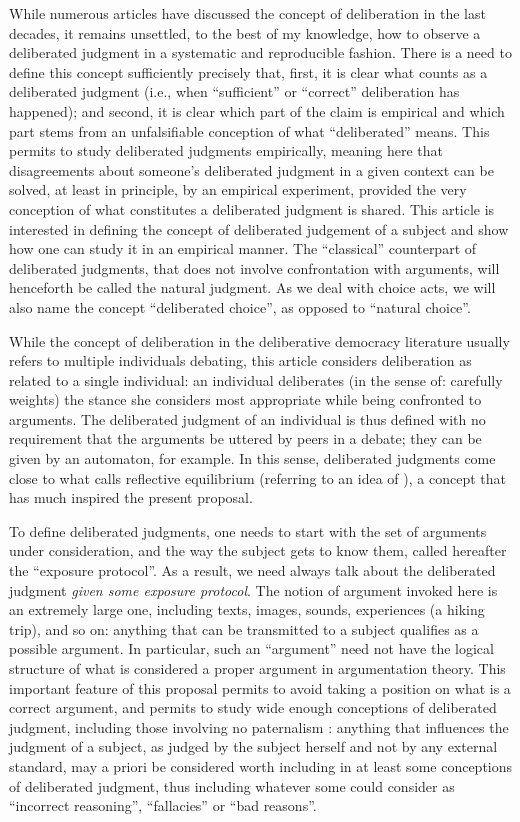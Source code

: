 \documentclass[version=last, pagesize, twoside=off, bibliography=totoc, DIV=calc, fontsize=12pt, a4paper, french, english]{scrartcl}
\begin{document}
While numerous articles have discussed the concept of deliberation in the last decades, it remains unsettled, to the best of my knowledge, how to observe a deliberated judgment in a systematic and reproducible fashion. There is a need to define this concept sufficiently precisely that, first, it is clear what counts as a deliberated judgment (i.e., when “sufficient” \citep{meinard_justification_2020} or “correct” deliberation has happened); and second, it is clear which part of the claim is empirical and which part stems from an unfalsifiable conception of what “deliberated” means. This permits to study deliberated judgments empirically, meaning here that disagreements about someone’s deliberated judgment in a given context can be solved, at least in principle, by an empirical experiment, provided the very conception of what constitutes a deliberated judgment is shared. This article is interested in defining the concept of deliberated judgement of a subject and show how one can study it in an empirical manner. The “classical” counterpart of deliberated judgments, that does not involve confrontation with arguments, will henceforth be called the natural judgment. As we deal with choice acts, we will also name the concept “deliberated choice”, as opposed to “natural choice”.

While the concept of deliberation in the deliberative democracy literature usually refers to multiple individuals debating, this article considers deliberation as related to a single individual: an individual deliberates (in the sense of: carefully weights) the stance she considers most appropriate while being confronted to arguments. The deliberated judgment of an individual is thus defined with no requirement that the arguments be uttered by peers in a debate; they can be given by an automaton, for example. In this sense, deliberated judgments come close to what \citet{rawls_theory_1999} calls reflective equilibrium (referring to an idea of \citet{goodman_fact_1983}), a concept that has much inspired the present proposal.

To define deliberated judgments, one needs to start with the set of arguments under consideration, and the way the subject gets to know them, called hereafter the “exposure protocol”. As a result, we need always talk about the deliberated judgment \emph{given some exposure protocol}. The notion of argument invoked here is an extremely large one, including texts, images, sounds, experiences (a hiking trip), and so on: anything that can be transmitted to a subject qualifies as a possible argument. In particular, such an “argument” need not have the logical structure of what is considered a proper argument in argumentation theory. This important feature of this proposal permits to avoid taking a position on what is a correct argument, and permits to study wide enough conceptions of deliberated judgment, including those involving no paternalism \citep{cailloux_formal_2020}: anything that influences the judgment of a subject, as judged by the subject herself and not by any external standard, may a priori be considered worth including in at least some conceptions of deliberated judgment, thus including whatever some could consider as “incorrect reasoning”, “fallacies” or “bad reasons”.
\end{document}
